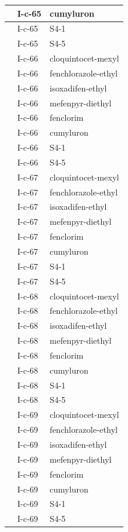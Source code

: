 \documentclass[11pt,a4paper]{article}
\begin{document}
\begin{table}[h]
\begin{tabular}{|l|l|l|}
 & I-c-65 & cumyluron \\ \hline
 & I-c-65 & S4-1 \\ \hline
 & I-c-65 & S4-5 \\ \hline
 & I-c-66 & cloquintocet-mexyl \\ \hline
 & I-c-66 & fenchlorazole-ethyl \\ \hline
 & I-c-66 & isoxadifen-ethyl \\ \hline
 & I-c-66 & mefenpyr-diethyl \\ \hline
 & I-c-66 & fenclorim \\ \hline
 & I-c-66 & cumyluron \\ \hline
 & I-c-66 & S4-1 \\ \hline
 & I-c-66 & S4-5 \\ \hline
 & I-c-67 & cloquintocet-mexyl \\ \hline
 & I-c-67 & fenchlorazole-ethyl \\ \hline
 & I-c-67 & isoxadifen-ethyl \\ \hline
 & I-c-67 & mefenpyr-diethyl \\ \hline
 & I-c-67 & fenclorim \\ \hline
 & I-c-67 & cumyluron \\ \hline
 & I-c-67 & S4-1 \\ \hline
 & I-c-67 & S4-5 \\ \hline
 & I-c-68 & cloquintocet-mexyl \\ \hline
 & I-c-68 & fenchlorazole-ethyl \\ \hline
 & I-c-68 & isoxadifen-ethyl \\ \hline
 & I-c-68 & mefenpyr-diethyl \\ \hline
 & I-c-68 & fenclorim \\ \hline
 & I-c-68 & cumyluron \\ \hline
 & I-c-68 & S4-1 \\ \hline
 & I-c-68 & S4-5 \\ \hline
 & I-c-69 & cloquintocet-mexyl \\ \hline
 & I-c-69 & fenchlorazole-ethyl \\ \hline
 & I-c-69 & isoxadifen-ethyl \\ \hline
 & I-c-69 & mefenpyr-diethyl \\ \hline
 & I-c-69 & fenclorim \\ \hline
 & I-c-69 & cumyluron \\ \hline
 & I-c-69 & S4-1 \\ \hline
 & I-c-69 & S4-5 \\ \hline

\end{tabular}
\end{table}
\end{document}
